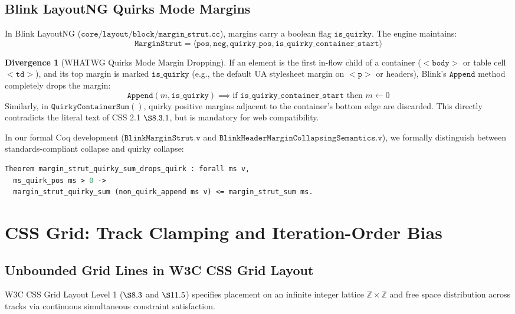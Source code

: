 \documentclass[11pt,a4paper]{article}
\theoremstyle{definition}
\newtheorem{divergence}{Divergence}[section]
\begin{document}
\subsection{Blink LayoutNG Quirks Mode Margins}
In Blink LayoutNG ($\mathtt{core/layout/block/margin\_strut.cc}$), margins carry a boolean flag $\mathtt{is\_quirky}$. The engine maintains:
\begin{equation}
    \mathtt{MarginStrut} = \langle \mathtt{pos}, \mathtt{neg}, \mathtt{quirky\_pos}, \mathtt{is\_quirky\_container\_start} \rangle
\end{equation}

\begin{divergence}[WHATWG Quirks Mode Margin Dropping]
If an element is the first in-flow child of a container ($\mathtt{<body>}$ or table cell $\mathtt{<td>}$), and its top margin is marked $\mathtt{is\_quirky}$ (e.g., the default UA stylesheet margin on $\mathtt{<p>}$ or headers), Blink's $\mathtt{Append}$ method completely drops the margin:
\begin{equation}
    \mathtt{Append}(m, \mathtt{is\_quirky}) \implies \text{if } \mathtt{is\_quirky\_container\_start} \text{ then } m \gets 0
\end{equation}
Similarly, in $\mathtt{QuirkyContainerSum()}$, quirky positive margins adjacent to the container's bottom edge are discarded. This directly contradicts the literal text of CSS 2.1 $\S 8.3.1$, but is mandatory for web compatibility.
\end{divergence}

In our formal Coq development ($\mathtt{BlinkMarginStrut.v}$ and $\mathtt{BlinkHeaderMarginCollapsingSemantics.v}$), we formally distinguish between standards-compliant collapse and quirky collapse:
\begin{lstlisting}[language=Caml,basicstyle=\small\ttfamily]
Theorem margin_strut_quirky_sum_drops_quirk : forall ms v,
  ms_quirk_pos ms > 0 ->
  margin_strut_quirky_sum (non_quirk_append ms v) <= margin_strut_sum ms.
\end{lstlisting}

\section{CSS Grid: Track Clamping and Iteration-Order Bias}

\subsection{Unbounded Grid Lines in W3C CSS Grid Layout}
W3C CSS Grid Layout Level 1 ($\S 8.3$ and $\S 11.5$) specifies placement on an infinite integer lattice $\mathbb{Z} \times \mathbb{Z}$ and free space distribution across tracks via continuous simultaneous constraint satisfaction.
\end{document}
